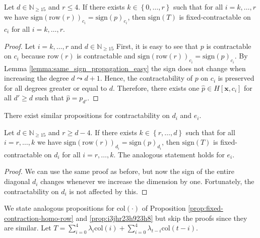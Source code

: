 \begin{proposition}\label{prop:fixed-contraction-homo-row}
    Let \( d \in \mathbb{N}_{\geq 15} \) and \( r \leq 4 \). If there exists \( k \in \left\{ 0, \dots, r \right\} \) such that for all \( i = k, \dots, r\) we have \(  \mathrm{sign}(\mathrm{row}(r))_{c_i} = \mathrm{sign}(p)_{c_i} \),
    then  \( \mathrm{sign}(T) \) is fixed-contractable on \( c_i \) for all \( i = k, \dots, r \).
\end{proposition}

\begin{proof}
    Let \( i = k, \dots, r \) and \( d \in \mathbb{N}_{\geq 15} \)
    First, it is easy to see that \( p \) is contractable on \( c_i \) because \( \mathrm{row}(r) \) is contractable and \( \mathrm{sign}(\mathrm{row}(r))_{c_i} = \mathrm{sign}(p)_{c_i} \). By Lemma \ref{lemma:same_sign_propagation_easy} the sign does not change when increasing the degree \( d \leadsto d+1 \). Hence, the contractability of \( p \) on \( c_i \) is preserved for all degrees greater or equal to \( d \). Therefore, there exists one \( \hat p \in H[\mathbf{x}, c_i] \) for all \( d' \geq d \) such that \( \hat p = p_{d'} \).
\end{proof}

There exist similar propositions for contractability on \( d_i \) and \( e_i \).

\begin{proposition}\label{prop:i3jhr23h923h8}
    Let \( d \in \mathbb{N}_{\geq 15} \) and \( r \geq d-4 \). If there exists \( k \in \left\{ r, \dots, d \right\} \) such that for all \( i = r, \dots, k\) we have \(  \mathrm{sign}(\mathrm{row}(r))_{d_i} = \mathrm{sign}(p)_{d_i} \),
then  \( \mathrm{sign}(T) \) is fixed-contractable on \( d_i \) for all \( i = r, \dots, k\). The analogous statement holds for \( e_i \).
\end{proposition}

\begin{proof}
    We can use the same proof as before, but now the sign of the entire diagonal $d_{i}$ changes whenever we increase the dimension by one. Fortunately, the contractability on $d_{i}$ is not affected by this. 
\end{proof}

We state analogous propositions for \( \mathrm{col}(\cdot) \) of Proposition \ref{prop:fixed-contraction-homo-row} and \ref{prop:i3jhr23h923h8} but skip the proofs since they are similar. Let \(  T = \sum_{i=0}^{4}  \lambda_{i} \mathrm{col}(i) + \sum_{i=0}^{4}  \lambda_{t-i} \mathrm{col}(t-i) \).

